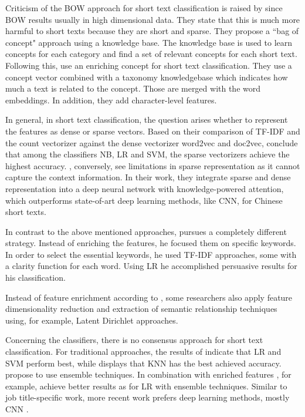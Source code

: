 \documentclass[12pt, a4paper, titlepage]{article}
\begin{document}
Criticism of the \ac{BOW} approach for short text classification is raised by \citet{WangF2014} since \ac{BOW} results usually in high dimensional data. They state that this is much more harmful to short texts because they are short and sparse. They propose a ``bag of concept" approach using a knowledge base. The knowledge base is used to learn concepts for each category and find a set of relevant concepts for each short text. Following this, \citet{wang2017J} use an enriching concept for short text classification. They use a concept vector combined with a taxonomy knowledgebase which indicates how much a text is related to the concept. Those are merged with the word embeddings. In addition, they add character-level features. 

In general, in short text classification, the question arises whether to represent the features as dense or sparse vectors. Based on their comparison of \ac{TF-IDF} and the count vectorizer against the dense vectorizer word2vec and doc2vec, \cite{WangY2017} conclude that among the classifiers \ac{NB}, \ac{LR} and \ac{SVM}, the sparse vectorizers achieve the highest accuracy. \cite{Chen2019}, conversely, see limitations in sparse representation as it cannot capture the context information. In their work, they integrate sparse and dense representation into a deep neural network with knowledge-powered attention, which outperforms state-of-art deep learning methods, like \ac{CNN}, for Chinese short texts. 

In contrast to the above mentioned approaches, \citet{sun2012} pursues a completely different strategy. Instead of enriching the features, he focused them on specific keywords. In order to select the essential keywords, he used \ac{TF-IDF} approaches, some with a clarity function for each word. Using \ac{LR} he accomplished persuasive results for his classification.

Instead of feature enrichment according to \citet{Song2014}, some researchers also apply feature dimensionality reduction and extraction of semantic relationship techniques using, for example, Latent Dirichlet approaches.

Concerning the classifiers, there is no consensus approach for short text classification. For traditional approaches, the results of \cite{WangY2017} indicate that \ac{LR} and \ac{SVM} perform best, while \cite{Khamar2013} displays that \ac{KNN} has the best achieved accuracy. \citet{Song2014} propose to use ensemble techniques. In combination with enriched features \citet{Bouaziz2014}, for example, achieve better results as for \ac{LR} with ensemble techniques. Similar to job title-specific work, more recent work prefers deep learning methods, mostly \ac{CNN} \citep{Chen2019}. 
\end{document}
